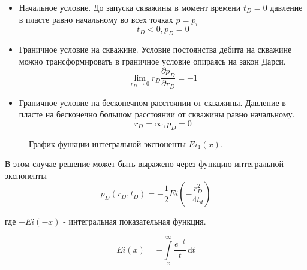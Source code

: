 \begin{itemize}
	\item Начальное условие. До запуска скважины в момент времени  $t_D = 0$ давление в пласте равно начальному во всех точках $p=p_i$
	$$ t_D < 0, p_D = 0 $$ 
	\item Граничное условие на скважине.  Условие постоянства дебита на скважине можно трансформировать в граничное условие опираясь на закон Дарси.
	$$ \lim_{r_D \to 0} {r_D \frac{\partial p_D}{\partial r_D}} = -1$$
	\item Граничное условие на бесконечном расстоянии от скважины. Давление в пласте на бесконечно большом расстоянии от скважины равно начальному.
	$$ r_D = \infty, p_D = 0$$
\end{itemize}

\begin{figure}
	\begin{center}
		\caption{График функции интегральной экспоненты $Ei_1(x)$.}
		\label{ris:ei1}
	\end{center}
\end{figure}



В этом случае решение может быть выражено через функцию интегральной экспоненты 
$$ p_D(r_D,t_D) = - \frac{1}{2} Ei \left(- \dfrac{ r_D^2}{4t_d} \right)$$

где $-Ei(-x)$ - интегральная показательная функция.

$$Ei(x)=-\int\limits_{x}^{\infty}\frac{e^{-t}}{t}\,\mathrm dt$$

